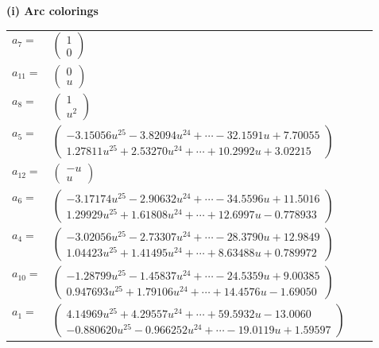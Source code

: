 \documentclass[1p]{elsarticle_modified}
\theoremstyle{definition}
\begin{document}
\flushleft \textbf{(i) Arc colorings}\\
\begin{tabular}{m{7pt} m{180pt} m{7pt} m{180pt} }
\flushright $a_{7}=$&$\begin{pmatrix}1\\0\end{pmatrix}$ \\
\flushright $a_{11}=$&$\begin{pmatrix}0\\u\end{pmatrix}$ \\
\flushright $a_{8}=$&$\begin{pmatrix}1\\u^2\end{pmatrix}$ \\
\flushright $a_{5}=$&$\begin{pmatrix}-3.15056 u^{25}-3.82094 u^{24}+\cdots-32.1591 u+7.70055\\1.27811 u^{25}+2.53270 u^{24}+\cdots+10.2992 u+3.02215\end{pmatrix}$ \\
\flushright $a_{12}=$&$\begin{pmatrix}- u\\u\end{pmatrix}$ \\
\flushright $a_{6}=$&$\begin{pmatrix}-3.17174 u^{25}-2.90632 u^{24}+\cdots-34.5596 u+11.5016\\1.29929 u^{25}+1.61808 u^{24}+\cdots+12.6997 u-0.778933\end{pmatrix}$ \\
\flushright $a_{4}=$&$\begin{pmatrix}-3.02056 u^{25}-2.73307 u^{24}+\cdots-28.3790 u+12.9849\\1.04423 u^{25}+1.41495 u^{24}+\cdots+8.63488 u+0.789972\end{pmatrix}$ \\
\flushright $a_{10}=$&$\begin{pmatrix}-1.28799 u^{25}-1.45837 u^{24}+\cdots-24.5359 u+9.00385\\0.947693 u^{25}+1.79106 u^{24}+\cdots+14.4576 u-1.69050\end{pmatrix}$ \\
\flushright $a_{1}=$&$\begin{pmatrix}4.14969 u^{25}+4.29557 u^{24}+\cdots+59.5932 u-13.0060\\-0.880620 u^{25}-0.966252 u^{24}+\cdots-19.0119 u+1.59597\end{pmatrix}$ \\

\end{tabular}
\end{document}
